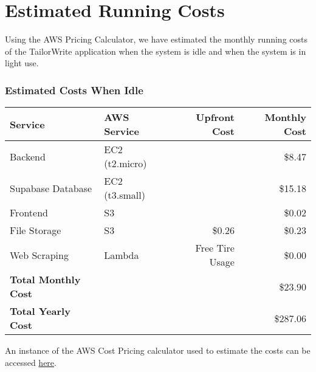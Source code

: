 \documentclass[a4paper, 11pt]{article}
\newcommand{\estimatedCostInIdleURL}{https://calculator.aws/\#/estimate?id=d3e602b082d82bd97aafcc93904ce67516634eb8}
\begin{document}
\section{Estimated Running Costs} 

Using the AWS Pricing Calculator, we have estimated the monthly running costs of the TailorWrite application when the system is idle and when the system is in light use. 


\begin{table}[htbp]
    \subsubsection*{Estimated Costs When Idle}

    \newlength{\tableRowSpacing}
    \setlength{\tableRowSpacing}{3pt}   %

    \centering
    \begin{tabularx}{\textwidth}{XXrr}
    \toprule
    Service             & AWS Service       & Upfront Cost & Monthly Cost \\
    \midrule
    Backend             & EC2 (t2.micro)    &               & \$8.47      \\ \addlinespace[\tableRowSpacing]
    Supabase Database   & EC2 (t3.small)    &               & \$15.18     \\ \addlinespace[\tableRowSpacing]
    Frontend            & S3                &               & \$0.02      \\ \addlinespace[\tableRowSpacing]
    File Storage        & S3                & \$0.26        & \$0.23      \\ \addlinespace[\tableRowSpacing]
    Web Scraping        & Lambda            & Free Tire Usage & \$0.00    \\ 
    \midrule
    \textbf{Total Monthly Cost}   &&& \$23.90 \\    \addlinespace[\tableRowSpacing]
    \textbf{Total Yearly Cost}   &&& \$287.06 \\
    \bottomrule
    \end{tabularx}
    
    \raggedright \vspace{1em}
    An instance of the AWS Cost Pricing calculator used to estimate the costs can be accessed \href{\estimatedCostInIdleURL}{here}.
\end{table}
\end{document}
